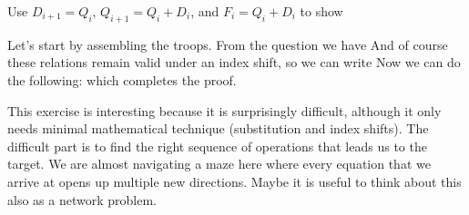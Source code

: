 Use $D_{i+1}=Q_i$, $Q_{i+1}=Q_i+D_i$, and $F_i=Q_i+D_i$ to show 

\solution
Let's start by assembling the troops. From the question we have 
And of course these relations remain valid under an index shift, so we can write
Now we can do the following:
which completes the proof. 

This exercise is interesting because it is surprisingly difficult, although it only needs minimal mathematical technique (substitution and index shifts). The difficult part is to find the right sequence of operations that leads us to the target. We are almost navigating a maze here where every equation that we arrive at opens up multiple new directions. Maybe it is useful to think about this also as a network problem.

